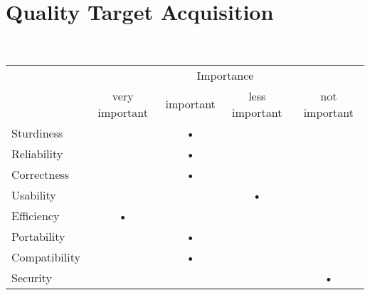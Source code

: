\section{Quality Target Acquisition}

~\\

\begin{center}
	
	\begin{tabular}{lcccc}
		
		\cline{2-5}
		& \multicolumn{4}{c}{Importance} \\
		\cline{2-5}
			 & very important & important & less important & not important \\
		\hline \hline
		
		\multicolumn{1}{l||}{Sturdiness} & &\textbf{•} & & \\ \hline
		\multicolumn{1}{l||}{Reliability} & &\textbf{•} & &  \\ \hline
		\multicolumn{1}{l||}{Correctness} & & \textbf{•}& &  \\ \hline
		\multicolumn{1}{l||}{Usability} & & &\textbf{•} &  \\ \hline
		\multicolumn{1}{l||}{Efficiency} &\textbf{•} & & &  \\ \hline
		\multicolumn{1}{l||}{Portability} & &\textbf{•} & &  \\ \hline
		\multicolumn{1}{l||}{Compatibility} & & \textbf{•}& &  \\ \hline
		\multicolumn{1}{l||}{Security} & & & & \textbf{•} \\ 
		
		\hline \hline
	
	\end{tabular}
	
\end{center}